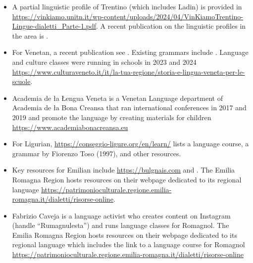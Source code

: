 \documentclass[a4paper,11pt]{article}
\begin{document}
\begin{itemize}
\item A partial linguistic profile of Trentino (which includes Ladin) is provided in \url{https://vinkiamo.unitn.it/wp-content/uploads/2024/04/VinKiamoTrentino-Lingue-dialetti_Parte-1.pdf}. A recent publication on the linguistic profiles in the area is \citet{casalicchio2024dialetti}.

\item For Venetan, a recent publication see \citet{pescarini2024dialetti}. Existing grammars include \citet{belloni1991grammatica}. Language and culture classes were running in schools in 2023 and 2024 \url{https://www.culturaveneto.it/it/la-tua-regione/storia-e-lingua-veneta-per-le-scuole}.

\item Academia de ła Łengua Veneta is a Venetan Language department of Academia de ła Bona Creansa that ran international conferences in 2017 and 2019 and promote the language by creating materials for children
\url{https://www.academiabonacreansa.eu}

\item For Ligurian, \url{https://conseggio-ligure.org/en/learn/} lists a language course, a grammar by Fiorenzo Toso (1997), and other resources.
  
\item Key resources for Emilian include \url{https://bulgnais.com} and \citet{vitali2020vol2}. The Emilia Romagna Region hosts resources on their webpage dedicated to its regional language  \url{https://patrimonioculturale.regione.emilia-romagna.it/dialetti/risorse-online}.

\item Fabrizio Caveja is a language activist who creates content on Instagram (handle ``Rumagnulesta'') and runs language classes for Romagnol. The Emilia Romagna Region hosts resources on their webpage dedicated to its regional language which includes the link to a language course for Romagnol \url{https://patrimonioculturale.regione.emilia-romagna.it/dialetti/risorse-online} 
  
\end{itemize}
\end{document}
